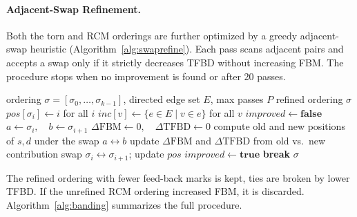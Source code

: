 \documentclass[12pt]{article}
\theoremstyle{definition}
\begin{document}
\paragraph{Adjacent-Swap Refinement.}
Both the torn and RCM orderings are further optimized by a greedy adjacent-swap heuristic (Algorithm~\ref{alg:swaprefine}). Each pass scans adjacent pairs and accepts a swap only if it strictly decreases TFBD without increasing FBM. The procedure stops when no improvement is found or after 20 passes.

\begin{algorithm}[H]
	\caption{Adjacent-Swap Refinement}\label{alg:swaprefine}
	\begin{algorithmic}[1]
		\Require ordering $\sigma = [\sigma_0, \ldots, \sigma_{k-1}]$, directed edge set $E$, max passes $P$
		\Ensure refined ordering $\sigma$
		\State $\mathit{pos}[\sigma_i] \gets i$ for all $i$ 
		\State $\mathit{inc}[v] \gets \{e \in E \mid v \in e\}$ for all $v$ 
		\State $\mathit{improved} \gets \textbf{false}$
		\State $a \gets \sigma_i,\quad b \gets \sigma_{i+1}$
		\State $\Delta\text{FBM} \gets 0,\quad \Delta\text{TFBD} \gets 0$
		\State compute old and new positions of $s, d$ under the swap $a \leftrightarrow b$
		\State update $\Delta\text{FBM}$ and $\Delta\text{TFBD}$ from old vs.\ new contribution
		\EndFor
		\State swap $\sigma_i \leftrightarrow \sigma_{i+1}$; update $\mathit{pos}$
		\State $\mathit{improved} \gets \textbf{true}$
		\EndIf
		\EndFor
		 \textbf{break} \EndIf
		\EndFor
		\State \Return $\sigma$
	\end{algorithmic}
\end{algorithm}

\noindent The refined ordering with fewer feed-back marks is kept, ties are broken by lower TFBD. If the unrefined RCM ordering increased FBM, it is discarded. Algorithm~\ref{alg:banding} summarizes the full procedure.
\end{document}
